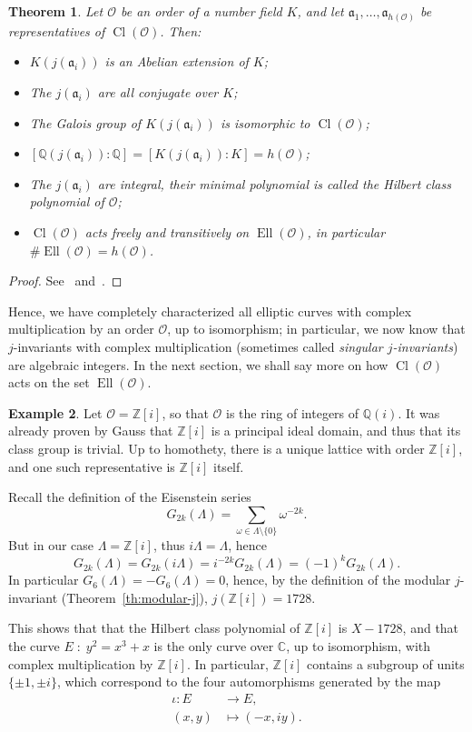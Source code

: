 \documentclass[10pt]{article}
\theoremstyle{plain}
\newtheorem{theorem}{Theorem}
\theoremstyle{definition}
\newtheorem{example}[theorem]{Example}
\DeclareMathOperator{\Cl}{Cl}
\DeclareMathOperator{\Ell}{Ell}
\def\O{\ensuremath{\mathcal{O}}}
\def\a{\ensuremath{\mathfrak{a}}}
\begin{document}
\begin{theorem}
  \label{th:compl-mult}
  Let $\O$ be an order of a number field $K$, and let
  $\a_1,\dots,\a_{h(\O)}$ be representatives of $\Cl(\O)$. %
  Then:
  \begin{itemize}
  \item $K(j(\a_i))$ is an Abelian extension of $K$;
  \item The $j(\a_i)$ are all conjugate over $K$;
  \item The Galois group of $K(j(\a_i))$ is isomorphic to $\Cl(\O)$;
  \item $[ℚ(j(\a_i)):ℚ] = [K(j(\a_i)):K] = h(\O)$;
  \item The $j(\a_i)$ are integral, their minimal polynomial is called
    the \emph{Hilbert class polynomial} of $\O$;
  \item $\Cl(\O)$ acts freely and transitively on $\Ell(\O)$, in
    particular $\#\Ell(\O) = h(\O)$.
  \end{itemize}
\end{theorem}
\begin{proof}
  See~\cite[Ch.~II]{silverman:advanced} and~\cite[Ch.~10]{lang1987elliptic}.
\end{proof}

Hence, we have completely characterized all elliptic curves with
complex multiplication by an order $\O$, up to isomorphism; in
particular, we now know that $j$-invariants with complex
multiplication (sometimes called \emph{singular $j$-invariants}) are
algebraic integers. %
In the next section, we shall say more on how $\Cl(\O)$ acts on the set
$\Ell(\O)$.

\begin{example}
  Let $\O=ℤ[i]$, so that $\O$ is the ring of integers of $ℚ(i)$. %
  It was already proven by Gauss that $ℤ[i]$ is a principal ideal
  domain, and thus that its class group is trivial. %
  Up to homothety, there is a unique lattice with order $ℤ[i]$, and
  one such representative is $ℤ[i]$ itself.

  Recall the definition of the Eisenstein series
  \[G_{2k}(Λ) = \sum_{ω∈Λ\setminus\{0\}} ω^{-2k}.\]
  But in our case $Λ=ℤ[i]$, thus $iΛ=Λ$, hence
  \[G_{2k}(Λ) = G_{2k}(iΛ) = i^{-2k}G_{2k}(Λ) = (-1)^kG_{2k}(Λ).\] In
  particular $G_6(Λ) = - G_6(Λ) = 0$, hence, by the definition of the
  modular $j$-invariant (Theorem~\ref{th:modular-j}),
  $j(ℤ[i]) = 1728$.

  This shows that that the Hilbert class polynomial of $ℤ[i]$ is
  $X-1728$, and that the curve $E\;:\;y^2=x^3+x$ is the only curve
  over $ℂ$, up to isomorphism, with complex multiplication by
  $ℤ[i]$. %
  In particular, $ℤ[i]$ contains a subgroup of units $\{±1,±i\}$,
  which correspond to the four automorphisms generated by the map
  \begin{align*}
    ι : E &→ E,\\
    (x,y) &↦ (-x,iy).
  \end{align*}
\end{example}
\end{document}
